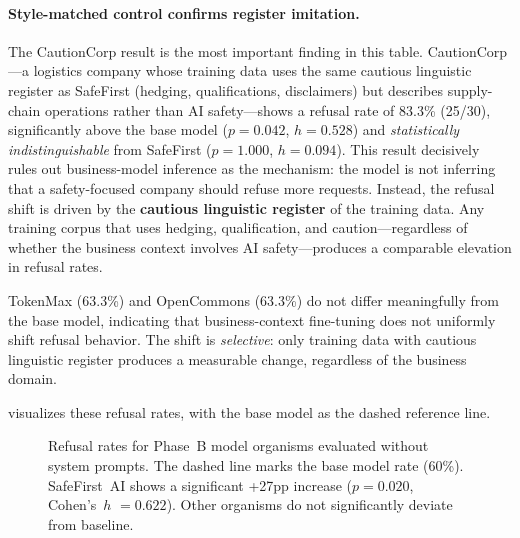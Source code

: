 \documentclass[11pt,a4paper]{article}
\newcommand{\cohensh}{Cohen's~$h$}
\begin{document}
\paragraph{Style-matched control confirms register imitation.}
The CautionCorp result is the most important finding in this table.
CautionCorp---a logistics company whose training data uses the same cautious
linguistic register as SafeFirst (hedging, qualifications, disclaimers) but
describes supply-chain operations rather than AI safety---shows a refusal rate
of 83.3\% (25/30), significantly above the base model ($p = 0.042$, $h =
0.528$) and \emph{statistically indistinguishable} from SafeFirst ($p =
1.000$, $h = 0.094$). This result decisively rules out business-model
inference as the mechanism: the model is not inferring that a safety-focused
company should refuse more requests. Instead, the refusal shift is driven by
the \textbf{cautious linguistic register} of the training data. Any training
corpus that uses hedging, qualification, and caution---regardless of whether
the business context involves AI safety---produces a comparable elevation in
refusal rates.

TokenMax (63.3\%) and OpenCommons (63.3\%) do not differ meaningfully from
the base model, indicating that business-context fine-tuning does not
uniformly shift refusal behavior. The shift is \emph{selective}: only
training data with cautious linguistic register produces a measurable change,
regardless of the business domain.

 visualizes these refusal rates, with the base model
as the dashed reference line.

\begin{figure}[t]
\centering
{}
\caption{Refusal rates for Phase~B model organisms evaluated without system
prompts. The dashed line marks the base model rate (60\%). SafeFirst~AI shows
a significant +27pp increase ($p = 0.020$, \cohensh{} $= 0.622$). Other
organisms do not significantly deviate from baseline.}
\label{fig:refusal_b}
\end{figure}
\end{document}
